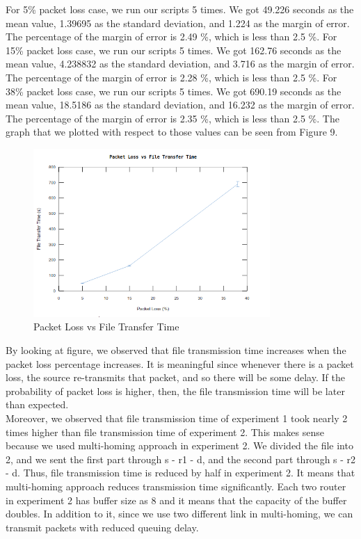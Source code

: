 \documentclass[conference]{IEEEtran}
\begin{document}
For 5\% packet loss case, we run our scripts 5 times. We got 49.226 seconds as the mean value, 1.39695 as the standard deviation, and 1.224 as the margin of error. The percentage of the margin of error is 2.49 \%, which is less than 2.5 \%. For 15\% packet loss case, we run our scripts 5 times. We got 162.76 seconds as the mean value, 4.238832 as the standard deviation, and 3.716 as the margin of error. The percentage of the margin of error is 2.28 \%, which is less than 2.5 \%. For 38\% packet loss case, we run our scripts 5 times. We got 690.19 seconds as the mean value, 18.5186 as the standard deviation, and 16.232 as the margin of error. The percentage of the margin of error is 2.35 \%, which is less than 2.5 \%. The graph that we plotted with respect to those values can be seen from Figure 9. \\

\begin{figure}[htp]
    \centering
    \includegraphics[width=9cm]{exp2.png}
    \caption{Packet Loss vs File Transfer Time}
    \label{fig:graph}
\end{figure} 

By looking at figure, we observed that file transmission time increases when the packet loss percentage increases. It is meaningful since whenever there is a packet loss, the source re-transmits that packet, and so there will be some delay. If the probability of packet loss is higher, then, the file transmission time will be later than expected. \\

Moreover, we observed that file transmission time of experiment 1 took nearly 2 times higher than file transmission time of experiment 2. This makes sense because we used multi-homing approach in experiment 2. We divided the file into 2, and we sent the first part through s - r1 - d, and the second part through s - r2 - d. Thus, file transmission time is reduced by half in experiment 2. It means that multi-homing approach reduces transmission time significantly. Each two router in experiment 2 has buffer size as 8 and it means that the capacity of the buffer doubles. In addition to it, since we use two different link in multi-homing, we can transmit packets with reduced queuing delay. \\
\end{document}
